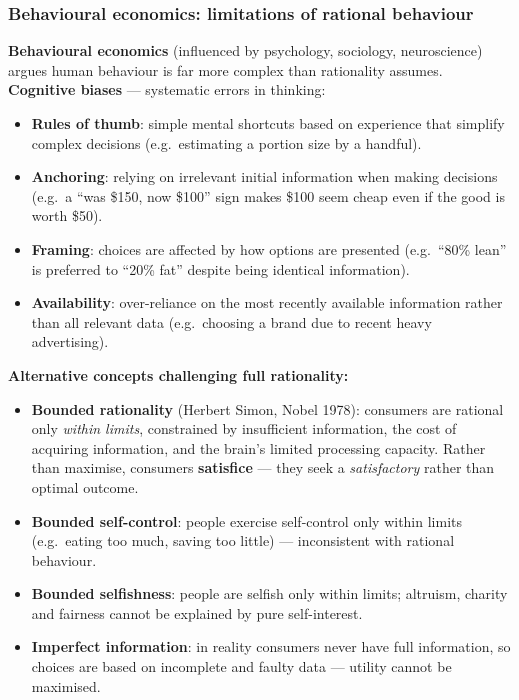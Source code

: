 \subsubsection*{Behavioural economics: limitations of rational behaviour}
\textbf{Behavioural economics} (influenced by psychology, sociology, neuroscience) argues human behaviour is far more complex than rationality assumes.\\
\textbf{Cognitive biases} --- systematic errors in thinking:
\begin{itemize}
  \item \textbf{Rules of thumb}: simple mental shortcuts based on experience that simplify complex decisions (e.g.\ estimating a portion size by a handful).
  \item \textbf{Anchoring}: relying on irrelevant initial information when making decisions (e.g.\ a ``was \$150, now \$100'' sign makes \$100 seem cheap even if the good is worth \$50).
  \item \textbf{Framing}: choices are affected by how options are presented (e.g.\ ``80\% lean'' is preferred to ``20\% fat'' despite being identical information).
  \item \textbf{Availability}: over-reliance on the most recently available information rather than all relevant data (e.g.\ choosing a brand due to recent heavy advertising).
\end{itemize}
\textbf{Alternative concepts challenging full rationality:}
\begin{itemize}
  \item \textbf{Bounded rationality} (Herbert Simon, Nobel 1978): consumers are rational only \textit{within limits}, constrained by insufficient information, the cost of acquiring information, and the brain's limited processing capacity. Rather than maximise, consumers \textbf{satisfice} --- they seek a \textit{satisfactory} rather than optimal outcome.
  \item \textbf{Bounded self-control}: people exercise self-control only within limits (e.g.\ eating too much, saving too little) --- inconsistent with rational behaviour.
  \item \textbf{Bounded selfishness}: people are selfish only within limits; altruism, charity and fairness cannot be explained by pure self-interest.
  \item \textbf{Imperfect information}: in reality consumers never have full information, so choices are based on incomplete and faulty data --- utility cannot be maximised.
\end{itemize}
